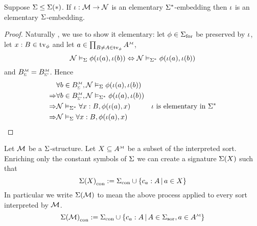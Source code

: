 \begin{lem}
    Suppose $\Sigma \leq \Sigma(*)$.
    If $\iota : \mathcal{M} \to \mathcal{N}$ is an elementary $\Sigma^*$-embedding then 
    $\iota$ is an elementary $\Sigma$-embedding. 
\end{lem}
\begin{proof}
    Naturally ,
    we use  to show it elementary:
    let $\phi \in {\Sigma}_\mathrm{for}$ be preserved by $\iota$,
    let $x : B \in \textrm{tv}_{\phi}$ 
    and let $a \in \prod_{B \ne A \in \tv{\phi}} \mmintp{A}$,
    \[\mathcal{N} \vDash_{\Sigma} \phi (\iota(a),\iota(b)) 
    \Leftrightarrow \mathcal{N} \vDash_{\Sigma^*} \phi (\iota(a),\iota(b))\]
    and $\subintp{\Si}{\MM}{B} = \subintp{\Si^*}{\MM}{B}$. Hence 
    \begin{align*}
        &\forall b \in \subintp{\Si}{\MM}{B}, 
        \NN \model{\Si} \phi(\io(a),\io(b)) \\
        \implies &\forall b \in \subintp{\Si^*}{\MM}{B}, 
        \NN \model{\Si^*} \phi(\io(a),\io(b)) \\
        \implies &\NN \model{\Si^*} \forall x : B, \phi(\io(a),x)
        & \text{$\io$ is elementary in $\Si^*$}\\
        \implies &\NN \model{\Si} \forall x : B, \phi(\io(a),x)
    \end{align*}
\end{proof}
    
\begin{nttn}
    Let $\mathcal{M}$ be a $\Sigma$-structure.
    Let $X \subs \mmintp{A}$ be a subset of the interpreted sort.
    Enriching only the constant symbols of $\Sigma$ we can create a signature 
    $\Sigma(X)$ such that 
    \[
        {\Sigma(X)}_\mathrm{con} := 
        {\Sigma}_\mathrm{con} \cup \left\{c_a : A \,|\, a \in X\right\}
    \]
    In particular we write $\Sigma(\mathcal{M})$ to mean the above process applied to 
    every sort interpreted by $\mathcal{M}$.
    \[
        \const{\Si(\MM)} := 
        \const{\Si} \cup \set{c_a : A \st A \in \sort{\Si}, a \in \mmintp{A}}
    \]
\end{nttn}

